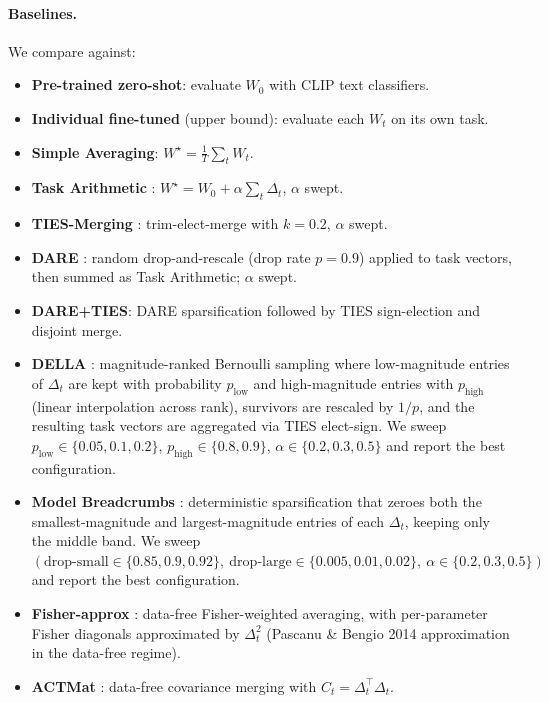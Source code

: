 \documentclass{article} %
\newcommand{\ws}{W^\star}
\begin{document}
\paragraph{Baselines.} We compare against:
\begin{itemize}[leftmargin=1.5em]
\item \textbf{Pre-trained zero-shot}: evaluate $W_0$ with CLIP text classifiers.
\item \textbf{Individual fine-tuned} (upper bound): evaluate each $W_t$ on its own task.
\item \textbf{Simple Averaging}: $\ws = \tfrac{1}{T}\sum_t W_t$.
\item \textbf{Task Arithmetic} \citep{ilharco2023editing}: $\ws = W_0 + \alpha \sum_t \Delta_t$, $\alpha$ swept.
\item \textbf{TIES-Merging} \citep{yadav2023tiesmerging}: trim-elect-merge with $k=0.2$, $\alpha$ swept.
\item \textbf{DARE} \citep{yu2024language}: random drop-and-rescale (drop rate $p{=}0.9$) applied to task vectors, then summed as Task Arithmetic; $\alpha$ swept.
\item \textbf{DARE+TIES}: DARE sparsification followed by TIES sign-election and disjoint merge.
\item \textbf{DELLA} \citep{deep2024della}: magnitude-ranked Bernoulli sampling where low-magnitude entries of $\Delta_t$ are kept with probability $p_\text{low}$ and high-magnitude entries with $p_\text{high}$ (linear interpolation across rank), survivors are rescaled by $1/p$, and the resulting task vectors are aggregated via TIES elect-sign. We sweep $p_\text{low}\in\{0.05,0.1,0.2\}$, $p_\text{high}\in\{0.8,0.9\}$, $\alpha\in\{0.2,0.3,0.5\}$ and report the best configuration.
\item \textbf{Model Breadcrumbs} \citep{davari2024model}: deterministic sparsification that zeroes both the smallest-magnitude and largest-magnitude entries of each $\Delta_t$, keeping only the middle band. We sweep $(\text{drop-small}\in\{0.85,0.9,0.92\},\ \text{drop-large}\in\{0.005,0.01,0.02\},\ \alpha\in\{0.2,0.3,0.5\})$ and report the best configuration.
\item \textbf{Fisher-approx} \citep{matena2022merging}: data-free Fisher-weighted averaging, with per-parameter Fisher diagonals approximated by $\Delta_t^2$ (Pascanu \& Bengio 2014 approximation in the data-free regime).
\item \textbf{ACTMat} \citep{hameed2025actmat}: data-free covariance merging with $C_t = \Delta_t^\top\Delta_t$.

\end{itemize}
\end{document}
